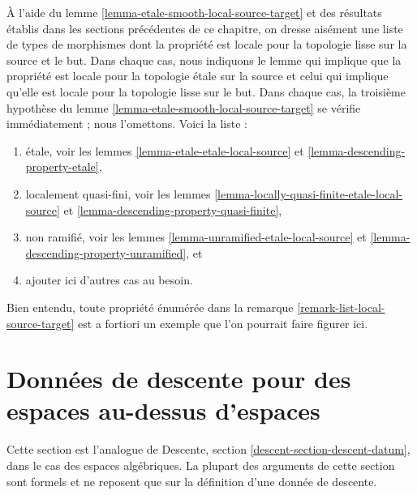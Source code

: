 \begin{remark}
\label{remark-list-etale-smooth-local-source-target}
À l'aide du lemme \ref{lemma-etale-smooth-local-source-target}
et des résultats établis dans les sections précédentes de ce chapitre, on dresse aisément
une liste de types de morphismes dont la propriété est locale pour la topologie lisse sur la
source et le but. Dans chaque cas, nous indiquons le lemme qui implique que
la propriété est locale pour la topologie étale sur la source et celui qui implique qu'elle
est locale pour la topologie lisse sur le but. Dans chaque cas, la troisième hypothèse
du lemme \ref{lemma-etale-smooth-local-source-target}
se vérifie immédiatement ; nous l'omettons. Voici la liste :
\begin{enumerate}
\item \'etale, voir les
lemmes \ref{lemma-etale-etale-local-source} et
\ref{lemma-descending-property-etale},
\item localement quasi-fini, voir les
lemmes \ref{lemma-locally-quasi-finite-etale-local-source} et
\ref{lemma-descending-property-quasi-finite},
\item non ramifié, voir les
lemmes \ref{lemma-unramified-etale-local-source} et
\ref{lemma-descending-property-unramified}, et
\item ajouter ici d'autres cas au besoin.
\end{enumerate}
Bien entendu, toute propriété énumérée dans la
remarque \ref{remark-list-local-source-target}
est a fortiori un exemple que l'on pourrait faire figurer ici.
\end{remark}






\section{Données de descente pour des espaces au-dessus d'espaces}
\label{section-descent-datum}

\noindent
Cette section est l'analogue de Descente, section
\ref{descent-section-descent-datum}, dans le cas des espaces algébriques.
La plupart des arguments de cette section sont formels et ne reposent
que sur la définition d'une donnée de descente.

